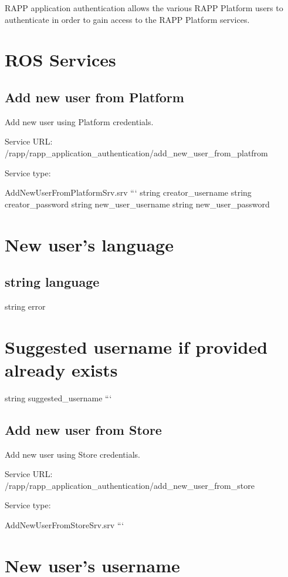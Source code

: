 R\-A\-P\-P application authentication allows the various R\-A\-P\-P Platform users to authenticate in order to gain access to the R\-A\-P\-P Platform services.

\section*{R\-O\-S Services}

\subsection*{Add new user from Platform}

Add new user using Platform credentials.

Service U\-R\-L\-: {\ttfamily /rapp/rapp\-\_\-application\-\_\-authentication/add\-\_\-new\-\_\-user\-\_\-from\-\_\-platfrom}

Service type\-:

Add\-New\-User\-From\-Platform\-Srv.\-srv ``` string creator\-\_\-username string creator\-\_\-password string new\-\_\-user\-\_\-username string new\-\_\-user\-\_\-password \section*{New user's language}

\subsection*{string language }

string error \section*{Suggested username if provided already exists}

string suggested\-\_\-username ```

\subsection*{Add new user from Store}

Add new user using Store credentials.

Service U\-R\-L\-: {\ttfamily /rapp/rapp\-\_\-application\-\_\-authentication/add\-\_\-new\-\_\-user\-\_\-from\-\_\-store}

Service type\-:

Add\-New\-User\-From\-Store\-Srv.\-srv ``` \section*{New user's username}

